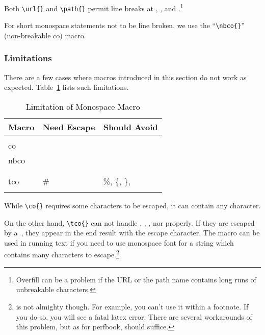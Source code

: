 Both \verb|\url{}| and \verb|\path{}| permit line breaks
at \qco{/}, \qco{-}, and .\footnote{
  Overfill can be a problem if the URL or the path name contains
  long runs of unbreakable characters.
}

For short monospace statements not to be line broken, we use
the ``\verb|\nbco{}|'' (non-breakable co) macro.

\subsubsection{Limitations}
\label{sec:app:styleguide:Limitations}

There are a few cases where macros introduced in this section
do not work as expected.
Table~\ref{tab:app:styleguide:Limitation of Monospace Macro}
lists such limitations.

\begin{table}[tbh]
\renewcommand*{\arraystretch}{1.2}\centering\footnotesize
\begin{tabular}{@{}lll@{}}\toprule
  Macro &  Need Escape & Should Avoid \\
  \midrule
  \co{\\co}, \co{\\nbco} & \co{\\}, \%, \{, \} & \\
  \co{\\tco}  & \# & \%, \{, \}, \co{\\} \\
  \bottomrule
\end{tabular}
\caption{Limitation of Monospace Macro}
\label{tab:app:styleguide:Limitation of Monospace Macro}
\end{table}

While \verb|\co{}| requires some characters to be escaped,
it can contain any character.

On the other hand, \verb|\tco{}| can not handle
\qco{\%}, \qco{\{}, \qco{\}}, nor \qco{\\} properly.
If they are escaped by a~\qco{\\},
they appear in the end result with the escape character.
The \qco{\\verb} macro can be used in running text if you
need to use monospace font for a string which contains
many characters to escape.\footnote{
  \co{\\verb} is not almighty though. For example, you can't use it
  within a footnote. If you do so, you will see a fatal latex error.
  There are several workarounds of this problem, but as for perfbook,
  \co{\\co\{\}} should suffice.}

